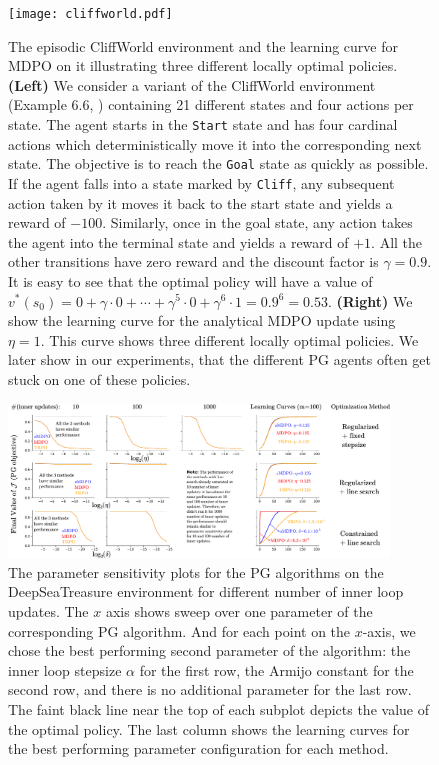 \documentclass[a4paper, 10pt]{article}
\begin{document}
\begin{figure}[h]
  \centering
  \texttt{[image: cliffworld.pdf]}
  \caption{The episodic CliffWorld environment and the learning curve for MDPO on it illustrating three different locally optimal policies. \textbf{(Left)} We consider a variant of the CliffWorld environment (Example 6.6, \citet{sutton18book}) containing 21 different states and four actions per state. The agent starts in the \texttt{Start} state and has four cardinal actions which deterministically move it into the corresponding next state. The objective is to reach the \texttt{Goal} state as quickly as possible. If the agent falls into a state marked by \texttt{Cliff}, any subsequent action taken by it moves it back to the start state and yields a reward of $-100$. Similarly, once in the goal state, any action takes the agent into the terminal state and yields a reward of $+1$. All the other transitions have zero reward and the discount factor is $\gamma = 0.9$. It is easy to see that the optimal policy will have a value of $v^*(s_0) = 0 + \gamma \cdot 0 + \cdots + \gamma^5 \cdot 0 + \gamma^6 \cdot 1 = 0.9^6 = 0.53$. \textbf{(Right)} We show the learning curve for the analytical MDPO update using $\eta = 1$. This curve shows three different locally optimal policies. We later show in our experiments, that the different PG agents often get stuck on one of these policies.}
  \label{fig: cliffworld}
 \end{figure}
  
\begin{figure}[!tbp]
    \centering
    \includegraphics[width=0.9\textwidth]{deep_sea_treasure_ablation.pdf}
    \caption{The parameter sensitivity plots for the  PG algorithms on the DeepSeaTreasure environment for different number of inner loop updates. The $x$ axis shows sweep over one parameter of the corresponding PG algorithm. And for each point on the $x$-axis, we chose the best performing second parameter of the algorithm: the inner loop stepsize $\alpha$ for the first row, the Armijo constant for the second row, and there is no additional parameter for the last row. The faint black line near the top of each subplot depicts the value of the optimal policy. The last column shows the learning curves for the best performing parameter configuration for each method.
    \label{fig:dst_sensitivity_plots}}
\end{figure}
 
\end{document}
